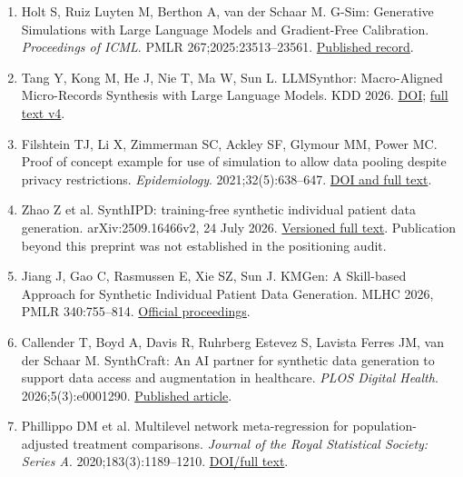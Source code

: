 \documentclass[11pt,letterpaper]{article}
\begin{document}
\begin{enumerate}[label=\arabic*.,leftmargin=2.1em,itemsep=.2em,parsep=0pt]

\item Holt S, Ruiz Luyten M, Berthon A, van der Schaar M. G-Sim: Generative Simulations with Large Language Models and Gradient-Free Calibration. \emph{Proceedings of ICML}. PMLR 267;2025:23513–\allowbreak{}23561. \href{https://proceedings.mlr.press/v267/holt25b.html}{Published record}.

\item Tang Y, Kong M, He J, Nie T, Ma W, Sun L. LLMSynthor: Macro-Aligned Micro-Records Synthesis with Large Language Models. KDD 2026. \href{https://doi.org/10.1145/3770855.3818965}{DOI}; \href{https://arxiv.org/html/2505.14752v4}{full text v4}.

\item Filshtein TJ, Li X, Zimmerman SC, Ackley SF, Glymour MM, Power MC. Proof of concept example for use of simulation to allow data pooling despite privacy restrictions. \emph{Epidemiology}. 2021;32(5):638–\allowbreak{}647. \href{https://pmc.ncbi.nlm.nih.gov/articles/PMC8338788/}{DOI and full text}.

\item Zhao Z et al. SynthIPD: training-free synthetic individual patient data generation. arXiv:2509.16466v2, 24 July 2026. \href{https://arxiv.org/html/2509.16466v2}{Versioned full text}. Publication beyond this preprint was not established in the positioning audit.

\item Jiang J, Gao C, Rasmussen E, Xie SZ, Sun J. KMGen: A Skill-based Approach for Synthetic Individual Patient Data Generation. MLHC 2026, PMLR 340:755–\allowbreak{}814. \href{https://proceedings.mlr.press/v340/jiang26a.html}{Official proceedings}.

\item Callender T, Boyd A, Davis R, Ruhrberg Estevez S, Lavista Ferres JM, van der Schaar M. SynthCraft: An AI partner for synthetic data generation to support data access and augmentation in healthcare. \emph{PLOS Digital Health}. 2026;5(3):e0001290. \href{https://journals.plos.org/digitalhealth/article?id=10.1371/journal.pdig.0001290}{Published article}.

\item Phillippo DM et al. Multilevel network meta-regression for population-adjusted treatment comparisons. \emph{Journal of the Royal Statistical Society: Series A}. 2020;183(3):1189–\allowbreak{}1210. \href{https://rss.onlinelibrary.wiley.com/doi/full/10.1111/rssa.12579}{DOI/\allowbreak{}full text}.


\end{enumerate}
\end{document}
